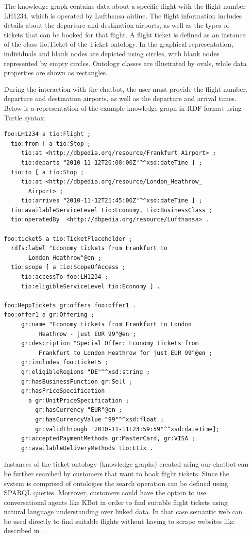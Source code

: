 \documentclass[runningheads]{llncs}
\begin{document}
The knowledge graph contains data about a specific flight with the flight number LH1234, which is operated by Lufthansa airline. The flight information includes details about the departure and destination airports, as well as the types of tickets that can be booked for that flight. A flight ticket is defined as an instance of the class tio:Ticket of the Ticket ontology. In the graphical representation, individuals and blank nodes are depicted using circles, with blank nodes represented by empty circles. Ontology classes are illustrated by ovals, while data properties are shown as rectangles. 

\FloatBarrier
During the interaction with the chatbot, the user must provide the flight number, departure and destination airports, as well as the departure and arrival times.
Below is a representation of the example knowledge graph in RDF format using Turtle syntax:
\begin{lstlisting}[basicstyle=\small]
foo:LH1234 a tio:Flight ;
  tio:from [ a tio:Stop ;
     tio:at <http://dbpedia.org/resource/Frankfurt_Airport> ;
     tio:departs "2010-11-12T20:00:00Z"^^xsd:dateTime ] ;
  tio:to [ a tio:Stop ;
     tio:at <http://dbpedia.org/resource/London_Heathrow_
       Airport> ;
     tio:arrives "2010-11-12T21:45:00Z"^^xsd:dateTime ] ;
  tio:availableServiceLevel tio:Economy, tio:BusinessClass ;          
  tio:operatedBy  <http://dbpedia.org/resource/Lufthansa> .
            
foo:ticket5 a tio:TicketPlaceholder ;
  rdfs:label "Economy tickets from Frankfurt to
       London Heathrow"@en ;
  tio:scope [ a tio:ScopeOfAccess ;
     tio:accessTo foo:LH1234 ;
     tio:eligibleServiceLevel tio:Economy ] .

foo:HeppTickets gr:offers foo:offer1 .
foo:offer1 a gr:Offering ;
     gr:name "Economy tickets from Frankfurt to London
          Heathrow - just EUR 99"@en ;
     gr:description "Special Offer: Economy tickets from
          Frankfurt to London Heathrow for just EUR 99"@en ;
     gr:includes foo:ticket5 ;
     gr:eligibleRegions "DE"^^xsd:string ;
     gr:hasBusinessFunction gr:Sell ;
     gr:hasPriceSpecification
       a gr:UnitPriceSpecification ;
         gr:hasCurrency "EUR"@en ;
         gr:hasCurrencyValue "99"^^xsd:float ;
         gr:validThrough "2010-11-11T23:59:59"^^xsd:dateTime];
     gr:acceptedPaymentMethods gr:MasterCard, gr:VISA ;
     gr:availableDeliveryMethods tio:Etix .	
\end{lstlisting}
Instances of the ticket ontology (knowledge graphs) created using our chatbot can be further searched by customers that want to book flight tickets. Since the system is comprised of ontologies the search operation can be defined using SPARQL queries. Moreover, customers could have the option to use conversational agents like KBot\cite{ait2020kbot} in order to find suitable flight tickets using natural language understanding over linked data. In that case semantic web can be used directly to find suitable flights without having to scrape websites like described in \cite{turnip2019application}.        
   
\end{document}
